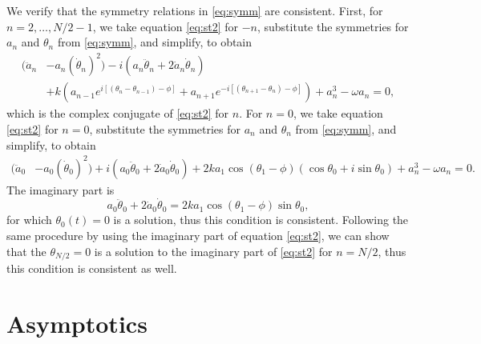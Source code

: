 \documentclass[11pt,reqno]{amsart}
\begin{document}
We verify that the symmetry relations in \cref{eq:symm} are consistent. First, for $n = 2, \dots, N/2-1$, we take equation \cref{eq:st2} for $-n$, substitute the symmetries for $a_n$ and $\theta_n$ from \cref{eq:symm}, and simplify, to obtain 
\begin{equation*}
\begin{aligned}
(\ddot a_n &- a_n (\dot \theta_n)^2) 
- i ( a_n \ddot\theta_n + 2 \dot a_n \dot \theta_n )\\
&+ k\left(a_{n-1}e^{i[(\theta_n - \theta_{n-1}) - \phi]} + a_{n+1}e^{-i[(\theta_{n+1} - \theta_{n}) - \phi]} \right)+a_n^3 - \omega a_n = 0,
\end{aligned}
\end{equation*}	
which is the complex conjugate of \cref{eq:st2} for $n$. For $n = 0$, we take equation \cref{eq:st2} for $n=0$, substitute the symmetries for $a_n$ and $\theta_n$ from \cref{eq:symm}, and simplify, to obtain 
\begin{equation*}
\begin{aligned}
(\ddot a_0 &- a_0 (\dot \theta_0)^2) 
+ i ( a_0 \ddot\theta_0 + 2 \dot a_0 \dot \theta_0 )
+ 2 k a_1 \cos(\theta_1 - \phi)(\cos \theta_0 + i \sin \theta_0) + a_n^3 - \omega a_n = 0.
\end{aligned}
\end{equation*}
The imaginary part is
\begin{equation}\label{eq:n0imagpart}
a_0 \ddot\theta_0 + 2 \dot a_0 \dot \theta_0 = 2 k a_1 \cos(\theta_1 - \phi) \sin \theta_0,
\end{equation}
for which $\theta_0(t) = 0$ is a solution, thus this condition is consistent. Following the same procedure by using the imaginary part of equation \cref{eq:st2}, we can show that the $\theta_{N/2} = 0$ is a solution to the imaginary part of \cref{eq:st2} for $n=N/2$, thus this condition is consistent as well.

\section{Asymptotics}\label{app:asymp}
\end{document}
